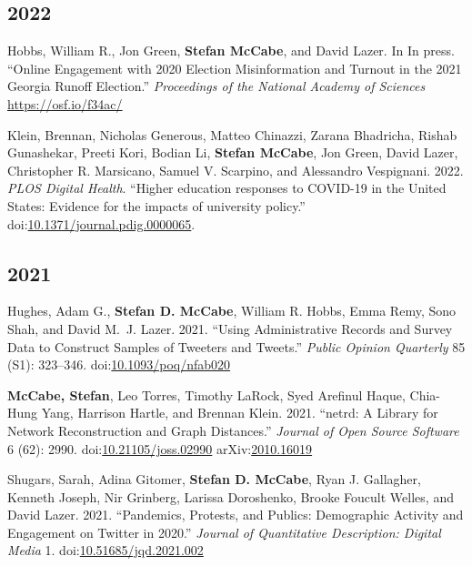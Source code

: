\documentclass[11pt, letter]{article}
\begin{document}
\subsection{2022}
\begin{hangparas}{.25in}{1}
Hobbs, William R., Jon Green, \textbf{Stefan McCabe}, and David
Lazer. In In press. ``Online Engagement with 2020 Election
Misinformation and Turnout in the 2021 Georgia Runoff Election.''
\textit{Proceedings of the National Academy of Sciences}
\href{https://osf.io/f34ac/}{https://osf.io/f34ac/}\vspace{2mm}

Klein, Brennan, Nicholas Generous, Matteo Chinazzi, Zarana Bhadricha,
Rishab Gunashekar, Preeti Kori, Bodian Li, \textbf{Stefan McCabe}, Jon
Green, David Lazer, Christopher R. Marsicano, Samuel V. Scarpino, and
Alessandro Vespignani. 2022. \textit{PLOS Digital Health}. ``Higher
education responses to COVID-19 in the United States: Evidence for the
impacts of university policy.''
doi:\href{https://doi.org/10.1371/journal.pdig.0000065}{10.1371/journal.pdig.0000065}.\vspace{2mm}
\end{hangparas}


\subsection{2021}
\begin{hangparas}{.25in}{1}
Hughes, Adam G.,\textsuperscript{\textdagger} \textbf{Stefan D.
McCabe},\textsuperscript{\textdagger} William R. Hobbs, Emma Remy, Sono
Shah, and David M.~J. Lazer. 2021. ``Using Administrative Records and
Survey Data to Construct Samples of Tweeters and Tweets.'' \textit{Public
Opinion Quarterly} 85 (S1): 323--346.
doi:\href{https://doi.org/10.1093/poq/nfab020}{10.1093/poq/nfab020}
\vspace{-1mm}

\textbf{McCabe, Stefan}, Leo Torres, Timothy LaRock, Syed Arefinul Haque,
Chia-Hung Yang, Harrison Hartle, and Brennan Klein. 2021.
``netrd: A Library for Network Reconstruction and Graph Distances.''
\textit{Journal of Open Source Software} 6 (62): 2990.
doi:\href{https://doi.org/10.21105/joss.02990}{10.21105/joss.02990}
arXiv:\href{https://arxiv.org/abs/2010.16019}{2010.16019} \vspace{-1mm}

Shugars, Sarah, Adina Gitomer, \textbf{Stefan D. McCabe}, Ryan J. Gallagher,
Kenneth Joseph, Nir Grinberg, Larissa Doroshenko, Brooke Foucult Welles, and
David Lazer. 2021. ``Pandemics, Protests, and Publics: Demographic Activity and
Engagement on Twitter in 2020.'' \textit{Journal of Quantitative Description:
  Digital Media} 1.
doi:\href{https://doi.org/10.51685/jqd.2021.002}{10.51685/jqd.2021.002} \vspace{2mm}
\end{hangparas}
\end{document}
